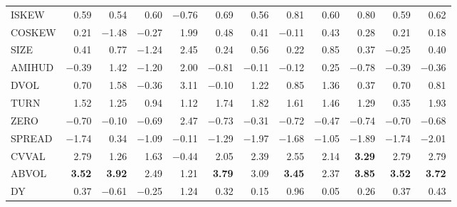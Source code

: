 \begin{tabular}{lrrrrrrrrrrr}
ISKEW & 0.59 & 0.54 & 0.60 & $-$0.76 & 0.69 & 0.56 & 0.81 & 0.60 & 0.80 & 0.59 & 0.62 \\
COSKEW & 0.21 & $-$1.48 & $-$0.27 & 1.99 & 0.48 & 0.41 & $-$0.11 & 0.43 & 0.28 & 0.21 & 0.18 \\
\addlinespace[2pt]
SIZE & 0.41 & 0.77 & $-$1.24 & 2.45 & 0.24 & 0.56 & 0.22 & 0.85 & 0.37 & $-$0.25 & 0.40 \\
AMIHUD & $-$0.39 & 1.42 & $-$1.20 & 2.00 & $-$0.81 & $-$0.11 & $-$0.12 & 0.25 & $-$0.78 & $-$0.39 & $-$0.36 \\
DVOL & 0.70 & 1.58 & $-$0.36 & 3.11 & $-$0.10 & 1.22 & 0.85 & 1.36 & 0.37 & 0.70 & 0.81 \\
TURN & 1.52 & 1.25 & 0.94 & 1.12 & 1.74 & 1.82 & 1.61 & 1.46 & 1.29 & 0.35 & 1.93 \\
ZERO & $-$0.70 & $-$0.10 & $-$0.69 & 2.47 & $-$0.73 & $-$0.31 & $-$0.72 & $-$0.47 & $-$0.74 & $-$0.70 & $-$0.68 \\
SPREAD & $-$1.74 & 0.34 & $-$1.09 & $-$0.11 & $-$1.29 & $-$1.97 & $-$1.68 & $-$1.05 & $-$1.89 & $-$1.74 & $-$2.01 \\
CVVAL & 2.79 & 1.26 & 1.63 & $-$0.44 & 2.05 & 2.39 & 2.55 & 2.14 & \textbf{3.29} & 2.79 & 2.79 \\
ABVOL & \textbf{3.52} & \textbf{3.92} & 2.49 & 1.21 & \textbf{3.79} & 3.09 & \textbf{3.45} & 2.37 & \textbf{3.85} & \textbf{3.52} & \textbf{3.72} \\
\addlinespace[2pt]
DY & 0.37 & $-$0.61 & $-$0.25 & 1.24 & 0.32 & 0.15 & 0.96 & 0.05 & 0.26 & 0.37 & 0.43 \\
\bottomrule
\end{tabular}